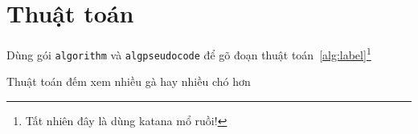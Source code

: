 \section{Thuật toán}
Dùng gói \texttt{algorithm} và \texttt{algpseudocode} để gõ đoạn thuật toán~\ref{alg:label}\footnote{Tất nhiên đây là dùng katana mổ ruồi!}

\begin{algorithm}
    \caption{Thuật toán đếm xem nhiều gà hay nhiều chó hơn}\label{alg:label}
    \begin{algorithmic}
        \EndFor{}
        \EndFor{}

        \Else{}
        \EndIf{}
        \EndFunction{}
    \end{algorithmic}
\end{algorithm}